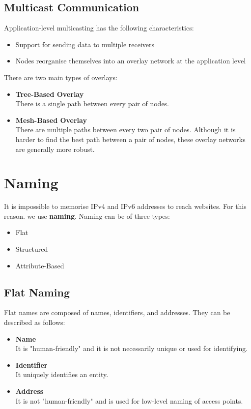 \documentclass{article}
\begin{document}
\subsection{Multicast Communication}
Application-level multicasting has the following characteristics:

\begin{itemize}
	\item Support for sending data to multiple receivers
	\item Nodes reorganise themselves into an overlay network at the application level
\end{itemize}

\noindent There are two main types of overlays:

\begin{itemize}
	\item \textbf{Tree-Based Overlay} \\
	There is a single path between every pair of nodes.
	
	\item \textbf{Mesh-Based Overlay} \\
	There are multiple paths between every two pair of nodes. Although it is harder to find the best path between a pair of nodes, these overlay networks are generally more robust.
\end{itemize}

\section{Naming}
It is impossible to memorise IPv4 and IPv6 addresses to reach websites. For this reason. we use \textbf{naming}. Naming can be of three types:

\begin{itemize}
	\item Flat
	\item Structured
	\item Attribute-Based
\end{itemize}

\subsection{Flat Naming}
Flat names are composed of names, identifiers, and addresses. They can be described as follows:

\begin{itemize}
	\item \textbf{Name} \\
	It is "human-friendly" and it is not necessarily unique or used for identifying.
	
	\item \textbf{Identifier} \\
	It uniquely identifies an entity.
	
	\item \textbf{Address} \\
	It is not "human-friendly" and is used for low-level naming of access points.
\end{itemize}
\end{document}
